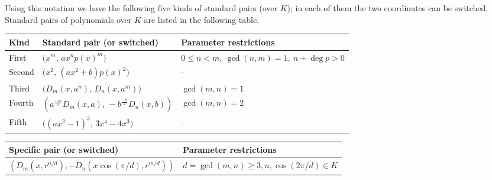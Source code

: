 \documentclass[12pt]{amsart}
\begin{document}
    Using this notation we have the following five kinds of standard pairs (over $K$); in each of them the two coordinates can be switched. Standard pairs of polynomials over $K$ are listed in the following table.
    \begin{table}[h!]
    \centering
    \begin{tabular}{|l l l|}
    \hline
    \textbf{Kind} &
    \textbf{Standard pair (or switched)} &
    \textbf{Parameter restrictions} \\
    \hline

    First  &
    $\bigl(x^{m},\, a x^{n} p(x)^{m}\bigr)$ &
    $0\leq n < m,\ \gcd(n,m)=1,\ n+\deg p > 0$ \\[2mm]

    Second &
    $\bigl(x^{2},\, (a x^{2} + b)p(x)^{2}\bigr)$ &
    -- \\[2mm]

    Third  &
    $\bigl(D_{m}(x,a^{n}),\, D_{n}(x,a^{m})\bigr)$ &
    $\gcd(m,n)=1$ \\[2mm]

    Fourth &
    $\left(a^\frac{-m}{2} D_{m}(x,a),\, -b^\frac{-n}{2} D_{n}(x,b)\right)$ &
    $\gcd(m,n)=2$ \\[2mm]

    Fifth  &
    $\bigl((a x^{2}-1)^{3},\, 3x^{4}-4 x^{3}\bigr)$ &
    -- \\ \hline
    \end{tabular}
    \end{table}
   
    \begin{table}[h!]
    \centering
    \begin{tabular}{|l l|}
    \hline
    \textbf{}  \textbf{Specific pair (or switched)} &
    \textbf{Parameter restrictions} \\
    \hline
    $(D_m(x, r^{n/d}), -D_n(x\cos(\pi/d), r^{m/d}))$ &
    $d= \gcd(m,n) \geq 3, n, \cos(2\pi/d) \in K$ \\[2mm]
    \hline
    \end{tabular}
    \end{table}
\end{document}
